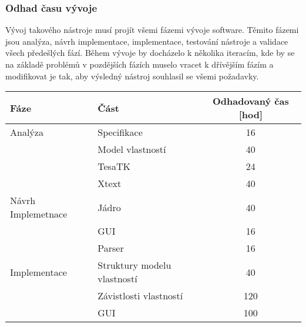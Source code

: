 \subsubsection{Odhad času vývoje}
Vývoj takového nástroje musí projít všemi fázemi vývoje software. Těmito fázemi jsou analýza, návrh implementace, implementace, testování nástroje a validace všech předešlých fází. Během vývoje by docházelo k několika iteracím, kde by se na základě problémů v pozdějších fázích muselo vracet k dřívějším fázím a modifikovat je tak, aby výsledný nástroj souhlasil se všemi požadavky.

\begin{table}[H]
\centering
\setlength{\extrarowheight}{0pt}
\addtolength{\extrarowheight}{\aboverulesep}
\addtolength{\extrarowheight}{\belowrulesep}
\setlength{\aboverulesep}{0pt}
\setlength{\belowrulesep}{0pt}
\begin{tabular}{|l|l|c|} 
\toprule
\rowcolor[rgb]{0.937,0.937,0.937} \textbf{Fáze}  & \textbf{Část}               & \textbf{Odhadovaný čas [hod]}   \\ 
\hline
Analýza                                          & Specifikace                 & 16                              \\ 
\hline
                                                 & Model vlastností            & 40                              \\ 
\hline
                                                 & TesaTK                      & 24                              \\ 
\hline
                                                 & Xtext                       & 40                              \\ 
\hline
Návrh Implemetnace                               & Jádro                       & 40                              \\ 
\hline
                                                 & GUI                         & 16                              \\ 
\hline
                                                 & Parser                      & 16                              \\ 
\hline
Implementace                                     & Struktury modelu vlastností & 40                              \\ 
\hline
                                                 & Závistlosti vlastností      & 120                             \\ 
\hline
                                                 & GUI                         & 100                             \\ 

\end{tabular}
\end{table}
